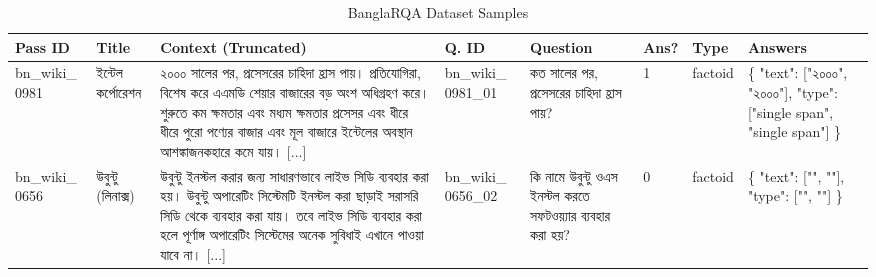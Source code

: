 \documentclass[acmsmall,screen,review]{acmart}
\newcommand{\bn}[1]{{\bengalifont #1}}
\begin{document}
\begin{table}[ht!]
    \centering
    \caption{BanglaRQA Dataset Samples}
    \label{tab:banglarqa_samples}
    \small %
    \setlength\tabcolsep{3pt} %
    \renewcommand{\arraystretch}{1.2} %
    
    \begin{tabularx}{\textwidth}{
        >{\raggedright\arraybackslash\scriptsize}p{1.2cm}   %
        >{\raggedright\arraybackslash\scriptsize}p{1.5cm}   %
        >{\scriptsize}X                                      %
        >{\raggedright\arraybackslash\scriptsize}p{1.2cm}   %
        >{\raggedright\arraybackslash\scriptsize}p{2.2cm}   %
        >{\centering\arraybackslash\scriptsize}p{0.6cm}     %
        >{\raggedright\arraybackslash\scriptsize}p{1.0cm}   %
        >{\raggedright\arraybackslash\tiny}p{3.0cm}         %
    }
        \toprule
        \textbf{Pass ID} & \textbf{Title} & \textbf{Context (Truncated)} & \textbf{Q. ID} & \textbf{Question} & \textbf{Ans?} & \textbf{Type} & \textbf{Answers} \\
        \midrule
        
        bn\_wiki\_ 0981 
        & \bn{ইন্টেল কর্পোরেশন} 
        & \bn{২০০০ সালের পর, প্রসেসরের চাহিদা হ্রাস পায়। প্রতিযোগিরা, বিশেষ করে এএমডি শেয়ার বাজারের বড় অংশ অধিগ্রহণ করে। শুরুতে কম ক্ষমতার এবং মধ্যম ক্ষমতার প্রসেসর এবং ধীরে ধীরে পুরো পণ্যের বাজার এবং মূল বাজারে ইন্টেলের অবস্থান আশঙ্কাজনকহারে কমে যায়। [...]} 
        & bn\_wiki\_ 0981\_01 
        & \bn{কত সালের পর, প্রসেসরের চাহিদা হ্রাস পায়?} 
        & 1 
        & factoid 
        & \ttfamily \{ "text": ["\bn{২০০০}", "\bn{২০০০}"], "type": ["single span", "single span"] \} \\
        \midrule
        
        bn\_wiki\_ 0656 
        & \bn{উবুন্টু (লিনাক্স)} 
        & \bn{উবুন্টু ইনস্টল করার জন্য সাধারণভাবে লাইভ সিডি ব্যবহার করা হয়। উবুন্টু অপারেটিং সিস্টেমটি ইনস্টল করা ছাড়াই সরাসরি সিডি থেকে ব্যবহার করা যায়। তবে লাইভ সিডি ব্যবহার করা হলে পূর্ণাঙ্গ অপারেটিং সিস্টেমের অনেক সুবিধাই এখানে পাওয়া যাবে না। [...]} 
        & bn\_wiki\_ 0656\_02 
        & \bn{কি নামে উবুন্টু ওএস ইনস্টল করতে সফটওয়্যার ব্যবহার করা হয়?} 
        & 0 
        & factoid 
        & \ttfamily \{ "text": ["", ""], "type": ["", ""] \} \\

        \bottomrule
    \end{tabularx}
\end{table}
\end{document}

